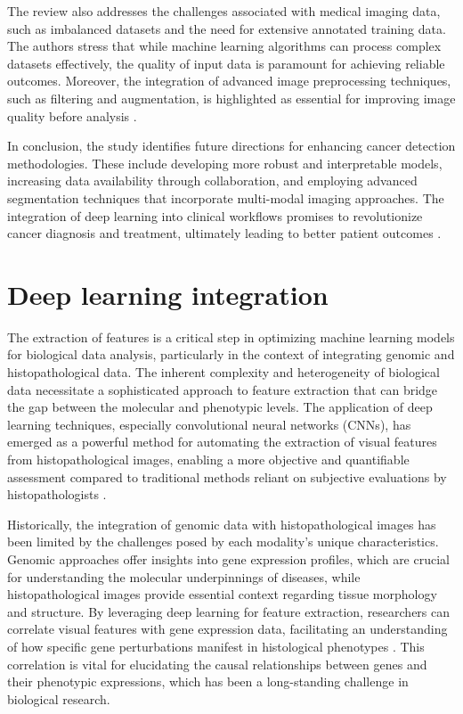 \documentclass[runningheads]{llncs}
\begin{document}
The review also addresses the challenges associated with medical imaging data, such as imbalanced datasets and the need for extensive annotated training data. The authors stress that while machine learning algorithms can process complex datasets effectively, the quality of input data is paramount for achieving reliable outcomes. Moreover, the integration of advanced image preprocessing techniques, such as filtering and augmentation, is highlighted as essential for improving image quality before analysis \cite{Istiak_2024}. 

In conclusion, the study identifies future directions for enhancing cancer detection methodologies. These include developing more robust and interpretable models, increasing data availability through collaboration, and employing advanced segmentation techniques that incorporate multi-modal imaging approaches. The integration of deep learning into clinical workflows promises to revolutionize cancer diagnosis and treatment, ultimately leading to better patient outcomes \cite{Istiak_2024}.
\section{Deep learning integration}
The extraction of features is a critical step in optimizing machine learning models for biological data analysis, particularly in the context of integrating genomic and histopathological data. The inherent complexity and heterogeneity of biological data necessitate a sophisticated approach to feature extraction that can bridge the gap between the molecular and phenotypic levels. The application of deep learning techniques, especially convolutional neural networks (CNNs), has emerged as a powerful method for automating the extraction of visual features from histopathological images, enabling a more objective and quantifiable assessment compared to traditional methods reliant on subjective evaluations by histopathologists \cite{Liviu_2020}.

Historically, the integration of genomic data with histopathological images has been limited by the challenges posed by each modality's unique characteristics. Genomic approaches offer insights into gene expression profiles, which are crucial for understanding the molecular underpinnings of diseases, while histopathological images provide essential context regarding tissue morphology and structure. By leveraging deep learning for feature extraction, researchers can correlate visual features with gene expression data, facilitating an understanding of how specific gene perturbations manifest in histological phenotypes \cite{Nam_2020}. This correlation is vital for elucidating the causal relationships between genes and their phenotypic expressions, which has been a long-standing challenge in biological research.
\end{document}
